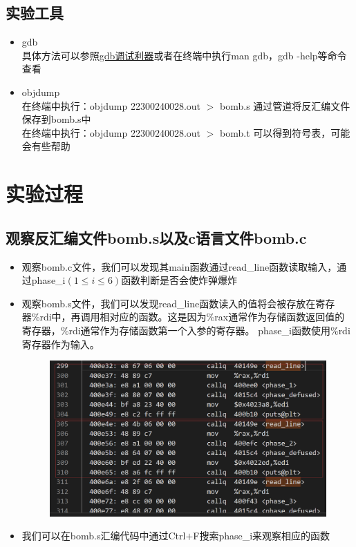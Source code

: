 \documentclass[12pt, a4paper, oneside]{ctexart}
\begin{document}
\subsection{实验工具}
\begin{itemize}
    \item gdb\\
具体方法可以参照\href{https://linuxtools-rst.readthedocs.io/zh_CN/latest/tool/gdb.html}{gdb调试利器}或者在终端中执行man gdb，gdb -help等命令查看
    \item objdump\\
    在终端中执行：objdump 22300240028.out $>$ bomb.s 通过管道将反汇编文件保存到bomb.s中\\
    在终端中执行：objdump 22300240028.out $>$ bomb.t 可以得到符号表，可能会有些帮助 
\end{itemize}

\section{实验过程}
\subsection{观察反汇编文件bomb.s以及c语言文件bomb.c}
\begin{itemize}
    \item 观察bomb.c文件，我们可以发现其main函数通过read\_line函数读取输入，通过phase\_i$(1\le i\le 6)$函数判断是否会使炸弹爆炸
    \item 观察bomb.s文件，我们可以发现read\_line函数读入的值将会被存放在寄存器\%rdi中，再调用相对应的函数。这是因为\%rax通常作为存储函数返回值的寄存器，\%rdi通常作为存储函数第一个入参的寄存器。
          phase\_i函数使用\%rdi寄存器作为输入。
    \begin{figure}[htbp]
        \includegraphics[scale=0.4]{image/2.1-1.png}
    \end{figure}  
    \item 我们可以在bomb.s汇编代码中通过Ctrl$+$F搜索phase\_i来观察相应的函数
\end{itemize}
\end{document}
